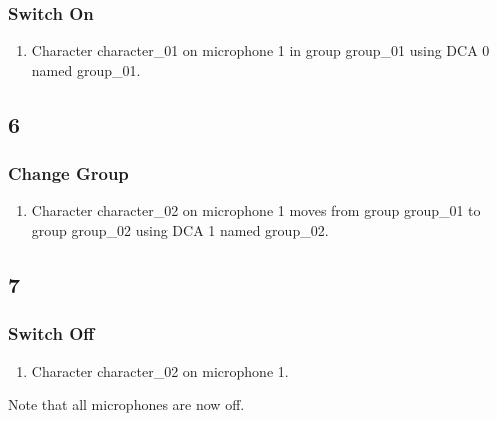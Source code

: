 \subsubsection* {Switch On}
\begin{enumerate}
\item Character character\_01 on microphone 1 in group group\_01 using DCA 0 named group\_01.
\end{enumerate}
\subsection* {6}
\subsubsection* {Change Group}
\begin{enumerate}
\item Character character\_02 on microphone 1 moves from group group\_01 to group group\_02 using DCA 1 named group\_02.
\end{enumerate}
\subsection* {7}
\subsubsection* {Switch Off}
\begin{enumerate}
\item Character character\_02 on microphone 1.
\end{enumerate}
Note that all microphones are now off.

